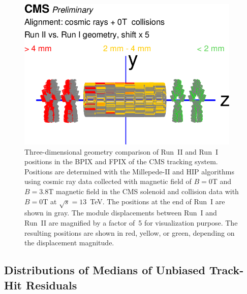 \begin{figure}[htb]
    \begin{center}
        \includegraphics[width=0.95\textwidth]{../figs/Alignment/AlRes_RunIIvsRunI.png}
    \end{center}
    \caption{Three-dimensional geometry comparison of Run~II and Run~I positions in the BPIX and FPIX of the CMS tracking system. Positions are determined with the Millepede-II and HIP algorithms using cosmic ray data collected with magnetic field of $B=0$T and $B=3.8$T magnetic field in the CMS solenoid and collision data with $B=0$T at $\sqrt{s}=13$~TeV. The positions at the end of Run~I are shown in gray. The module displacements between Run~I and Run~II are magnified by a factor of~5 for visualization purpose. The resulting positions are shown in red, yellow, or green, depending on the displacement magnitude. }
    \label{fig:GCP_3D}
\end{figure}

\subsection{Distributions of Medians of Unbiased Track-Hit Residuals}
\label{sec:AlRes_DMRs}

